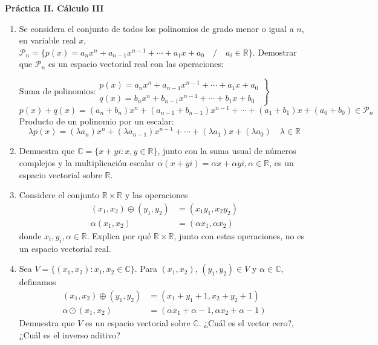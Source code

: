 \documentclass[12pt,letterpaper]{article}
\begin{document}
\begin{center}
    {\Large \bf Práctica II. Cálculo III}
\end{center}

\begin{enumerate}
  \item Se considera el conjunto de todos los polinomios de grado menor o igual a $n$, en variable real $x$, $\mathcal{P}_n = \{p(x)=a_nx^n+a_{n-1}x^{n-1}+\cdots+a_1x+a_0\quad /\quad a_i \in \mathbb{R} \}$. Demostrar que $\mathcal{P}_n$ es un espacio vectorial real con las operaciones:
  
  $
  \text{Suma de polinomios:}\left.\begin{array}{l}
    p(x) = a_nx^n+a_{n-1}x^{n-1}+\cdots+a_1x+a_0\\
    q(x) = b_nx^n+b_{n-1}x^{n-1}+\cdots+b_1x+b_0
  \end{array}\right\}
  $
  $$
  p(x)+q(x) = (a_n+b_n)x^n+(a_{n-1}+b_{n-1})x^{n-1}+ \cdots + (a_1+b_1)x+(a_0+b_0) \in \mathcal{P}_n
  $$
  Producto de un polinomio por un escalar:
  $$
  \lambda p(x) = (\lambda a_n)x^n + (\lambda a_{n-1})x^{n-1} + \cdots + (\lambda a_1)x + (\lambda a_0) \quad \lambda \in \mathbb{R}
  $$
  \item Demuestra que $\mathbb{C} = \{x + yi : x, y \in \mathbb{R}\}$, junto con la suma usual de números complejos y la multiplicación escalar $\alpha (x + yi) = \alpha x + \alpha yi, \alpha \in \mathbb{R}$, es un espacio vectorial sobre $\mathbb{R}$.
  \item Considere el conjunto $\mathbb{R}\times\mathbb{R}$ y las operaciones 
  \begin{align*}
    (x_1,x_2)\oplus (y_1,y_2) & = (x_1y_1,x_2y_2)\\
    \alpha (x_1,x_2) & = (\alpha x_1,\alpha x_2)    
  \end{align*}
  donde $x_i, y_i, \alpha \in \mathbb{R}$. Explica por qué $\mathbb{R} \times \mathbb{R}$, junto con estas operaciones, no es un espacio vectorial real.
  \item Sea $V = \{(x_1, x_2) : x_1, x_2 \in \mathbb{C}\}$. Para $(x_1, x_2)$, $(y_1, y_2) \in V$ y $\alpha \in \mathbb{C}$, definamos
  \begin{align*}
    (x_1, x_2) \oplus (y_1, y_2) & = (x_1 + y_1+1, x_2 + y_2+1)\\
    \alpha \odot (x_1, x_2) & = (\alpha x_1 + \alpha - 1, \alpha x_2+\alpha - 1)
  \end{align*}
  Demuestra que $V$ es un espacio vectorial sobre $\mathbb{C}$. ¿Cuál es el vector cero?, ¿Cuál es el inverso aditivo?

\end{enumerate}
\end{document}
